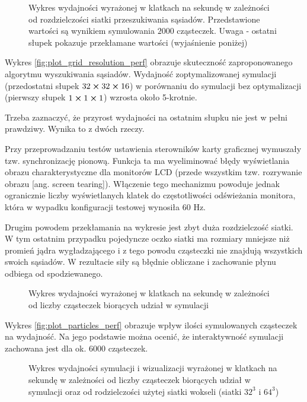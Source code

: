 \begin{figure}[H]

\caption{Wykres wydajności wyrażonej w klatkach na sekundę w zależności od rozdzielczości siatki przeszukiwania sąsiadów. Przedstawione wartości są wynikiem symulowania $2000$ cząsteczek. Uwaga - ostatni słupek pokazuje przekłamane wartości (wyjaśnienie poniżej)}
\label{fig:plot_grid_resolution_perf}
\end{figure}

\par
Wykres \eqref{fig:plot_grid_resolution_perf} obrazuje skuteczność zaproponowanego algorytmu wyszukiwania sąsiadów. Wydajność zoptymalizowanej symulacji (przedostatni słupek $32\cross32\cross16$) w porównaniu do symulacji bez optymalizacji (pierwszy słupek $1\cross1\cross1$) wzrosta około 5-krotnie.
\par
Trzeba zaznaczyć, że przyrost wydajności na ostatnim słupku nie jest w pełni prawdziwy. Wynika to z dwóch rzeczy.
\par
Przy przeprowadzaniu testów ustawienia sterowników karty graficznej wymuszały tzw. synchronizację pionową. Funkcja ta ma wyeliminować błędy wyświetlania obrazu charakterystyczne dla monitorów LCD (przede wszystkim tzw. rozrywanie obrazu [ang. screen tearing]). Włączenie tego mechanizmu powoduje jednak ogranicznie liczby wyświetlanych klatek do częstotliwości odświeżania monitora, która w wypadku konfiguracji testowej wynosiła 60 Hz.
\par
Drugim powodem przekłamania na wykresie jest zbyt duża rozdzielczość siatki. W tym ostatnim przypadku pojedyncze oczko siatki ma rozmiary mniejsze niż promień jądra wygładzającego i z tego powodu cząsteczki nie znajdują wszystkich swoich sąsiadów. W rezultacie siły są błędnie obliczane i zachowanie płynu odbiega od spodziewanego.

\begin{figure}[H]

\caption{Wykres wydajności wyrażonej w klatkach na sekundę w zależności od liczby cząsteczek biorących udział w symulacji}
\label{fig:plot_particles_perf}
\end{figure}

\par
Wykres \eqref{fig:plot_particles_perf} obrazuje wpływ ilości symulowanych cząsteczek na wydajność. Na jego podstawie można ocenić, że interaktywność symulacji zachowana jest dla ok. $6000$ cząsteczek.

\begin{figure}[H]
\centering

\caption{Wykres wydajności symulacji i wizualizacji wyrażonej w klatkach na sekundę w zależności od liczby cząsteczek biorących udział w symulacji oraz od rodzielczości użytej siatki wokseli (siatki $32^3$ i $64^3$)}
\label{fig:plot_particles_vis_perf}
\end{figure}


